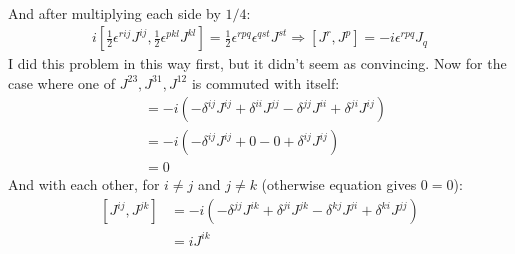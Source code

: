 \documentclass[12pt,a4]{article}
\begin{document}
\begin{enumerate}
\begin{enumerate}
\begin{align*}
    \end{align*}
    And after multiplying each side by $1/4$:
    \begin{align*}
          i \left[\frac{1}{2}\epsilon^{rij} J^{ij},\frac{1}{2}\epsilon^{pkl} J^{kl}\right] = \frac{1}{2} \epsilon^{rpq}\epsilon^{qst}J^{st}
          \Rightarrow [J^r,J^p] = -i\epsilon^{rpq}J_q
    \end{align*}
    I did this problem in this way first, but it didn't seem as convincing.
    Now for the case where one of $J^{23}, J^{31}, J^{12}$ is commuted with itself:
    \begin{align*}
      [J^{ij},J^{ij}]  &= -i(-\delta^{ij}J^{ij} + \delta^{ii}J^{jj} - \delta^{jj}J^{ii} + \delta^{ji}J^{ij})\\
                       &= -i(-\delta^{ij}J^{ij} + 0 - 0 + \delta^{ij}J^{ij})\\
                       &= 0 
    \end{align*}
    And with each other, for $i\neq j$ and $j \neq k$ (otherwise equation gives $0=0$):
    \begin{align*}
      [J^{ij},J^{jk}]  &= -i(-\delta^{jj}J^{ik} + \delta^{ji}J^{jk} - \delta^{kj}J^{ji} + \delta^{ki}J^{jj})\\
                       &= i J^{ik}\\

\end{align*}
\end{enumerate}
\end{enumerate}
\end{document}
